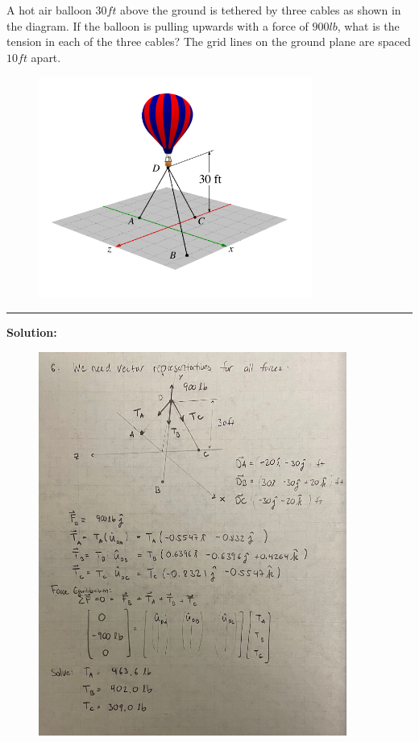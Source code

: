 
A hot air balloon $30 ft$ above the ground is tethered by three cables as shown in the diagram. If the balloon is pulling upwards with a force of $900 lb$, what is the tension in each of the three cables? The grid lines on the ground plane are spaced $10 ft$ apart.

\begin{figure}[ht!]
  \centering
  \includegraphics[width=0.8\textwidth,height=0.4\textheight,keepaspectratio]{fig.png}
\end{figure}

\vspace{.5cm}
\rule{\textwidth}{.4pt}
\vspace{.5cm}
\textbf{Solution:}
\begin{figure}[ht!]
  \centering
  \includegraphics[width=0.9\textwidth,
	           height=0.4\textheight,
		   keepaspectratio]{soln.png}
\end{figure}

